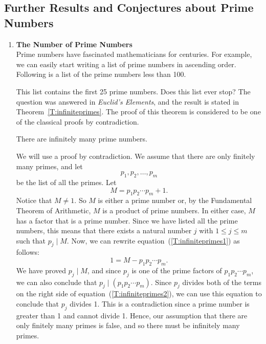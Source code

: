 \subsection*{Further Results and Conjectures about Prime Numbers}
\begin{enumerate}
  \item \textbf{The Number of Prime Numbers} \\
Prime numbers have fascinated mathematicians for centuries.  For example, we can easily start writing a list of prime numbers in ascending order.  Following is a list of the prime numbers less than 100.

\newpar
This list contains the first 25 prime numbers.  Does this list ever stop?  The question was answered in \emph{Euclid's Elements}, and the result is stated in 
Theorem~\ref{T:infiniteprimes}.  The proof of this theorem is considered to be one of the classical proofs by contradiction.
%

\begin{theorem}\label{T:infiniteprimes}
There are infinitely many prime numbers.
\end{theorem}

\setcounter{equation}{0}
\begin{myproof}
We will use a proof by contradiction.  We assume that there are only finitely many primes, and let
\[
p_1 , p_2 ,  \ldots , p_m
\]
be the list of all the primes.  Let
\begin{equation} \label{T:infiniteprimes1}
M = p_1 p_2  \cdots p_m  + 1.
\end{equation}
Notice that  $M \ne 1$. So  $M$  is either a prime number or, by the Fundamental Theorem of Arithmetic,  $M$  is a product of prime numbers.  In either case,  $M$  has a factor that is a prime number.  Since we have listed all the prime numbers, this means that there exists a natural number  $j$  with  
$1 \leq j \leq m$  such that  $p_j \mid  M$. Now, we can rewrite equation~(\ref{T:infiniteprimes1}) as follows:
\begin{equation} \label{T:infiniteprimes2}
1 = M - p_1 p_2  \cdots p_m. 
\end{equation}
We have proved $p_j \mid M$, and since  $p_j $ is one of the prime factors of  
$p_1 p_2  \cdots p_m $, we can also conclude that   
$p_j  \mid \left( {p_1 p_2  \cdots p_m } \right)$.  Since   $p_j $  divides both of the terms on the right side of equation~(\ref{T:infiniteprimes2}), we can use this equation to conclude that   $p_j$ divides 1.  This is a contradiction since a prime number is greater than 1 and cannot divide 1.  Hence, our assumption that there are only finitely many primes is false, and so there must be infinitely many primes.
\end{myproof}


\end{enumerate}
